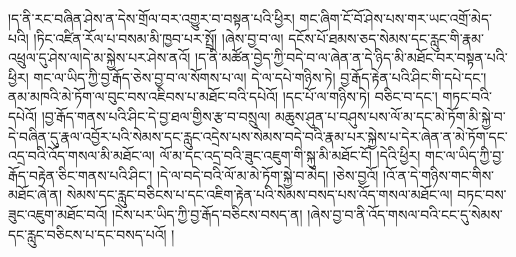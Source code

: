 །ད་ནི་རང་བཞིན་ཤེས་ན་དེས་གྲོལ་བར་འགྱུར་བ་བསྟན་པའི་ཕྱིར། གང་ཞིག་ངོ་བོ་ཤེས་པས་གར་ཡང་འགྲོ་མེད་པའི། །ཏིང་འཛིན་རོལ་པ་བསམ་མི་ཁྱབ་པར་སྤྲོ། །ཞེས་བྱ་བ་ལ། དངོས་པོ་ཐམས་ཅད་སེམས་དང་རླུང་གི་རྣམ་འཕྲུལ་དུ་ཤེས་ལ།དེ་མ་སྐྱེས་པར་ཤེས་ནའོ། །ད་ནི་མཚོན་བྱེད་ཀྱི་བདེ་བ་ལ་ཞེན་ན་དེ་ཉིད་མི་མཐོང་བར་བསྟན་པའི་ཕྱིར། གང་ལ་ཡིད་ཀྱི་བྱ་རྒོད་ཅེས་བྱ་བ་ལ་སོགས་པ་ལ། དེ་ལ་དཔེ་གཉིས་ཏེ། བྱ་རྒོད་རྟེན་པའི་ཤིང་གི་དཔེ་དང་། ནམ་མཁའི་མེ་ཏོག་ལ་བུང་བས་འཇིབས་པ་མཐོང་བའི་དཔེའོ། །དང་པོ་ལ་གཉིས་ཏེ། བཅིང་བ་དང་། གཏང་བའི་དཔེའོ། །བྱ་རྒོད་གནས་པའི་ཤིང་དེ་བྱ་ཐལ་གྱིས་རྩ་བ་བསྲུལ། མཆུས་ཤུན་པ་བཤུས་པས་ལོ་མ་དང་མེ་ཏོག་མི་སྐྱེ་བ་དེ་བཞིན་དུ་རྣལ་འབྱོར་པའི་སེམས་དང་རླུང་འདྲེས་པས་སེམས་བདེ་བའི་རྣམ་པར་སྐྱེས་པ་དེར་ཞེན་ན་མེ་ཏོག་དང་འདྲ་བའི་འོད་གསལ་མི་མཐོང་ལ། ལོ་མ་དང་འདྲ་བའི་ཟུང་འཇུག་གི་སྐུ་མི་མཐོང་ངོ། །དེའི་ཕྱིར། གང་ལ་ཡིད་ཀྱི་བྱ་རྒོད་བརྟེན་ཅིང་གནས་པའི་ཤིང་། །དེ་ལ་བདེ་བའི་ལོ་མ་མེ་ཏོག་སྐྱེ་བ་མེད། །ཅེས་བྱའོ། །འོ་ན་དེ་གཉིས་གང་གིས་མཐོང་ཞེ་ན། སེམས་དང་རླུང་བཅིངས་པ་དང་འཇིག་རྟེན་པའི་སེམས་བསད་པས་འོད་གསལ་མཐོང་ལ། བཏང་བས་ཟུང་འཇུག་མཐོང་བའོ། །ངེས་པར་ཡིད་ཀྱི་བྱ་རྒོད་བཅིངས་བསད་ན། །ཞེས་བྱ་བ་ནི་འོད་གསལ་བའི་ངང་དུ་སེམས་དང་རླུང་བཅིངས་པ་དང་བསད་པའོ། །
